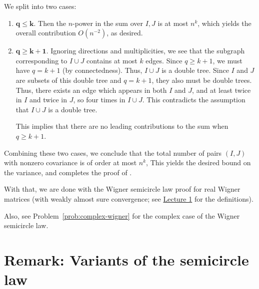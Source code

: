 \documentclass[letterpaper,11pt,oneside,reqno]{article}
\numberwithin{equation}{section}
\theoremstyle{definition}
\begin{document}
We split into two cases:
\begin{enumerate}
\item
\(\boldsymbol{q\le k.}\)
Then the $n$-power in the sum over $I,J$ is at most
$n^k$, which yields the overall contribution
$O(n^{-2})$, as desired.

\item
\(\boldsymbol{q\ge k+1.}\)
Ignoring directions and multiplicities,
we see that the subgraph corresponding to $I\cup J$
contains at most \(k\) edges. Since \(q \ge k + 1\), we must have \(q = k + 1\)
(by connectedness). Thus,
\(I \cup J\) is a double tree.
Since $I$ and $J$ are subsets of this double tree and $q=k+1$,
they also must be double trees.
Thus, there exists an edge which appears in both $I$ and $J$, and
at least twice in $I$ and twice in $J$, so four times in $I\cup J$.
This contradicts the assumption that $I\cup J$ is a double tree.

This implies that
there are no leading contributions to the sum when \(q\ge k+1\).
\end{enumerate}

Combining these two cases, we conclude that the total number of pairs \((I,J)\) with nonzero covariance is of order at most \(n^k\),
This yields the desired bound on the variance, and completes the proof of .

With that, we are done with the Wigner semicircle law proof for real
Wigner matrices
(with weakly almost sure convergence;
see \href{https://lpetrov.cc/rmt25/rmt25-notes/rmt2025-l01.pdf}{Lecture 1}
for the definitions).

Also, see Problem~\ref{prob:complex-wigner} for the complex case of
the Wigner semicircle law.

\section{Remark: Variants of the semicircle law}
\end{document}
